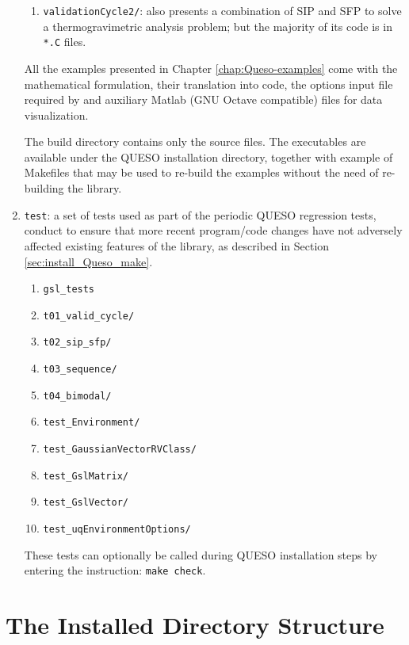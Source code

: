 \begin{enumerate}
\begin{enumerate}
\item \texttt{validationCycle2/}: also presents a combination of SIP and SFP to solve a thermogravimetric analysis problem; but the majority of its code is in \verb+*.C+ files.
\end{enumerate}

All the examples presented in Chapter \ref{chap:Queso-examples} come with the mathematical formulation, their translation into code, the options input file required by \Queso{} and auxiliary Matlab (GNU Octave compatible) files for data visualization.

The build directory contains only the source files. The executables are available under the QUESO installation directory, together with example of Makefiles that may be used to re-build the examples without the need of re-building the library.

\item  \texttt{test}: a set of tests used as part of the periodic QUESO regression tests, conduct to ensure that more recent program/code changes have not adversely affected existing features of the library, as described in Section \ref{sec:install_Queso_make}.
\begin{enumerate}
\item \texttt{gsl\_tests}
\item \texttt{t01\_valid\_cycle/}
\item \texttt{t02\_sip\_sfp/}
\item \texttt{t03\_sequence/}
\item \texttt{t04\_bimodal/}
\item \texttt{test\_Environment/}
\item \texttt{test\_GaussianVectorRVClass/}
\item \texttt{test\_GslMatrix/}
\item \texttt{test\_GslVector/}
\item \texttt{test\_uqEnvironmentOptions/}
\end{enumerate}

These tests can optionally be called during QUESO installation steps by entering the instruction: \verb+make check+.

\end{enumerate}


\section{The Installed Directory Structure} \label{sc-installed-dir-structure}

